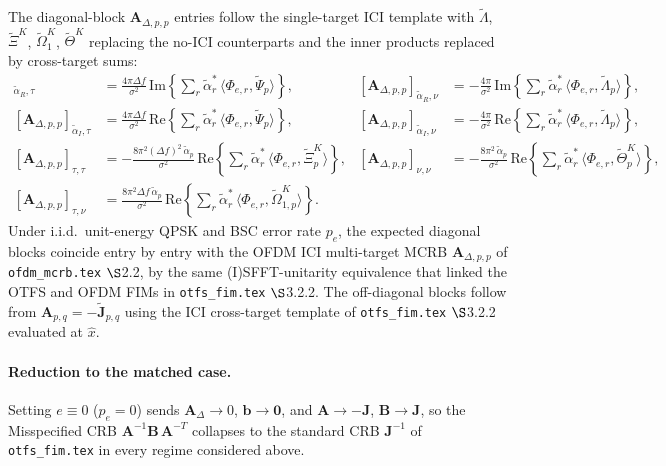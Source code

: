 \documentclass[11pt]{article}
\begin{document}
The diagonal-block \(\bm{A}_{\Delta, p,p}\) entries follow the single-target ICI template with \(\tilde{\Lambda}\), \(\tilde{\Xi}^K\), \(\tilde{\Omega}_1^K\), \(\tilde{\Theta}^K\) replacing the no-ICI counterparts and the inner products replaced by cross-target sums:
\begin{align}
    [\bm{A}_{\Delta, p,p}]_{\tilde{\alpha}_R, \tau} &= \tfrac{4\pi\Delta f}{\sigma^2}\, \mathrm{Im}\!\left\{ \sum_r \tilde{\alpha}_r^*\, \langle \Phi_{e,r}, \tilde{\Psi}_p\rangle \right\}, &
    [\bm{A}_{\Delta, p,p}]_{\tilde{\alpha}_R, \nu} &= -\tfrac{4\pi}{\sigma^2}\, \mathrm{Im}\!\left\{ \sum_r \tilde{\alpha}_r^*\, \langle \Phi_{e,r}, \tilde{\Lambda}_p\rangle \right\}, \\
    [\bm{A}_{\Delta, p,p}]_{\tilde{\alpha}_I, \tau} &= \tfrac{4\pi\Delta f}{\sigma^2}\, \mathrm{Re}\!\left\{ \sum_r \tilde{\alpha}_r^*\, \langle \Phi_{e,r}, \tilde{\Psi}_p\rangle \right\}, &
    [\bm{A}_{\Delta, p,p}]_{\tilde{\alpha}_I, \nu} &= -\tfrac{4\pi}{\sigma^2}\, \mathrm{Re}\!\left\{ \sum_r \tilde{\alpha}_r^*\, \langle \Phi_{e,r}, \tilde{\Lambda}_p\rangle \right\}, \\
    [\bm{A}_{\Delta, p,p}]_{\tau, \tau} &= -\tfrac{8\pi^2 (\Delta f)^2\, \tilde{\alpha}_p}{\sigma^2}\, \mathrm{Re}\!\left\{ \sum_r \tilde{\alpha}_r^*\, \langle \Phi_{e,r}, \tilde{\Xi}_p^K\rangle \right\}, &
    [\bm{A}_{\Delta, p,p}]_{\nu, \nu} &= -\tfrac{8\pi^2\, \tilde{\alpha}_p}{\sigma^2}\, \mathrm{Re}\!\left\{ \sum_r \tilde{\alpha}_r^*\, \langle \Phi_{e,r}, \tilde{\Theta}_p^K\rangle \right\}, \\
    [\bm{A}_{\Delta, p,p}]_{\tau, \nu} &= \tfrac{8\pi^2 \Delta f\, \tilde{\alpha}_p}{\sigma^2}\, \mathrm{Re}\!\left\{ \sum_r \tilde{\alpha}_r^*\, \langle \Phi_{e,r}, \tilde{\Omega}_{1,p}^K\rangle \right\}. & &
\end{align}
Under i.i.d.\ unit-energy QPSK and BSC error rate \(p_e\), the expected diagonal blocks coincide entry by entry with the OFDM ICI multi-target MCRB \(\bm{A}_{\Delta, p,p}\) of \texttt{ofdm\_mcrb.tex} \(\S\)2.2, by the same (I)SFFT-unitarity equivalence that linked the OTFS and OFDM FIMs in \texttt{otfs\_fim.tex} \(\S\)3.2.2. The off-diagonal blocks follow from \(\bm{A}_{p,q} = -\tilde{\bm{J}}_{p,q}\) using the ICI cross-target template of \texttt{otfs\_fim.tex} \(\S\)3.2.2 evaluated at \(\hat{x}\).

\paragraph{Reduction to the matched case.} Setting \(e \equiv 0\) (\(p_e = 0\)) sends \(\bm{A}_\Delta \to 0\), \(\bm{b} \to \bm{0}\), and \(\bm{A} \to -\bm{J}\), \(\bm{B} \to \bm{J}\), so the Misspecified CRB \(\bm{A}^{-1} \bm{B}\, \bm{A}^{-T}\) collapses to the standard CRB \(\bm{J}^{-1}\) of \texttt{otfs\_fim.tex} in every regime considered above.
\end{document}
